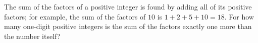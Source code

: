 The sum of the factors of a positive integer is found by adding all of its positive factors; for example, the sum of the factors of $10$ is $1+2+5+10=18$. For how many one-digit positive integers is the sum of the factors exactly one more than the number itself?
